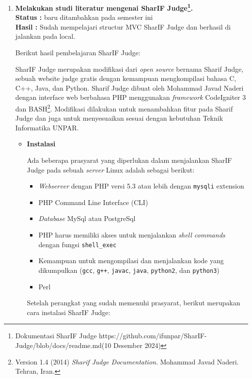 \documentclass[a4paper,twoside]{article}
\begin{document}
\begin{enumerate}
	\item \textbf{Melakukan studi literatur mengenai SharIF Judge\footnote{Dokumentasi SharIF Judge https://github.com/ifunpar/SharIF-Judge/blob/docs/readme.md(10 Desember 2024)}.}\\
	      {\bf Status :} baru ditambahkan pada semester ini\\
	      {\bf Hasil :} Sudah mempelajari structur MVC SharIF Judge dan berhasil di jalankan pada local.

	      Berikut hasil pembelajaran SharIF Judge:

	      SharIF Judge merupakan modifikasi dari \textit{open source} bernama Sharif Judge, sebuah website judge gratis dengan kemampuan mengkompilasi bahasa C, C++, Java, dan Python. Sharif Judge dibuat oleh Mohammad Javad Naderi dengan interface web berbahasa PHP menggunakan \textit{framework} CodeIgniter 3 dan BASH\footnote{Version 1.4 (2014) {\em Sharif Judge Documentation}. Mohammad Javad Naderi. Tehran, Iran.}. Modifikasi dilakukan untuk menambahkan fitur pada Sharif Judge dan juga untuk menyesuaikan sesuai dengan kebutuhan Teknik Informatika UNPAR.

	      \begin{itemize}
		      \item \textbf{Instalasi}
		            \label{sub:2:1:instalasi}

		            Ada beberapa prasyarat yang diperlukan dalam menjalankan SharIF Judge pada sebuah \textit{server} Linux adalah sebagai berikut:

		            \begin{itemize}
			            \item \textit{Webserver} dengan PHP versi 5.3 atau lebih dengan \texttt{mysqli} extension
			            \item PHP Command Line Interface (CLI)
			            \item \textit{Database} MySql atau PostgreSql
			            \item PHP harus memiliki akses untuk menjalankan \textit{shell commands} dengan fungsi \verb|shell_exec|
			            \item Kemampuan untuk mengompilasi dan menjalankan kode yang dikumpulkan (\texttt{gcc}, \texttt{g++}, \texttt{javac}, \texttt{java}, \texttt{python2}, dan \texttt{python3})
			            \item Perl
		            \end{itemize}

		            Setelah perangkat yang sudah memenuhi prasyarat, berikut merupakan cara instalasi SharIF Judge:


\end{itemize}
\end{enumerate}
\end{document}
